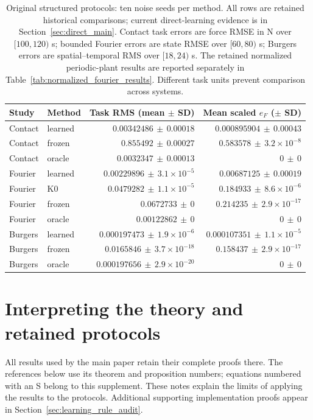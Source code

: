 \documentclass[journal]{IEEEtran}
\begin{document}
\begin{table}[t]
\centering
\caption{Original structured protocols: ten noise seeds per method. All rows are retained historical comparisons; current direct-learning evidence is in Section~\ref{sec:direct_main}. Contact task errors are force RMSE in N over $[100,120)$ s; bounded Fourier errors are state RMSE over $[60,80)$ s; Burgers errors are spatial--temporal RMS over $[18,24)$ s. The retained normalized periodic-plant results are reported separately in Table~\ref{tab:normalized_fourier_results}. Different task units prevent comparison across systems.}
\begin{tabular}{llrr}
\toprule Study & Method & Task RMS (mean $\pm$ SD) & Mean scaled $e_F$ ($\pm$ SD) \\
\midrule
Contact & learned & $0.00342486\,\pm\,0.00018$ & $0.000895904\,\pm\,0.00043$ \\
Contact & frozen & $0.855492\,\pm\,0.00027$ & $0.583578\,\pm\,3.2\times10^{-8}$ \\
Contact & oracle & $0.0032347\,\pm\,0.00013$ & $0\,\pm\,0$ \\
Fourier & learned & $0.00229896\,\pm\,3.1\times10^{-5}$ & $0.00687125\,\pm\,0.00019$ \\
Fourier & K0 & $0.0479282\,\pm\,1.1\times10^{-5}$ & $0.184933\,\pm\,8.6\times10^{-6}$ \\
Fourier & frozen & $0.0672733\,\pm\,0$ & $0.214235\,\pm\,2.9\times10^{-17}$ \\
Fourier & oracle & $0.00122862\,\pm\,0$ & $0\,\pm\,0$ \\
Burgers & learned & $0.000197473\,\pm\,1.9\times10^{-6}$ & $0.000107351\,\pm\,1.1\times10^{-5}$ \\
Burgers & frozen & $0.0165846\,\pm\,3.7\times10^{-18}$ & $0.158437\,\pm\,2.9\times10^{-17}$ \\
Burgers & oracle & $0.000197656\,\pm\,2.9\times10^{-20}$ & $0\,\pm\,0$ \\
\bottomrule
\end{tabular}
\label{tab:main_results}
\end{table}
%

\section{Interpreting the theory and retained protocols}
\label{sec:interpretation}
All results used by the main paper retain their complete proofs there. The references below
use its theorem and proposition numbers; equations numbered with an S
belong to this supplement. These notes explain the limits of applying the
results to the protocols. Additional supporting implementation proofs appear
in Section~\ref{sec:learning_rule_audit}.
\end{document}
